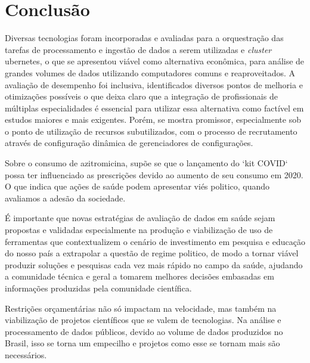 
\chapter{Conclusão}
\label{chap:conclusao}

Diversas tecnologias foram incorporadas e avaliadas para a orquestração das tarefas de processamento e ingestão de dados a serem utilizadas e \emph{cluster} ubernetes, o que se apresentou viável como alternativa econômica, para análise de grandes volumes de dados utilizando computadores comuns e reaproveitados. A avaliação de desempenho foi inclusiva, identificados diversos pontos de melhoria e otimizações possíveis o que deixa claro que a integração de profissionais de múltiplas especialidades é essencial para utilizar essa alternativa como factível em estudos maiores e mais exigentes. Porém, se mostra promissor, especialmente sob o ponto de utilização de recursos subutilizados, com o processo de recrutamento através de configuração dinâmica de gerenciadores de configurações. 

Sobre o consumo de azitromicina, supõe se que o lançamento do ‘kit COVID‘ possa ter influenciado as prescrições devido ao aumento de seu consumo em 2020. O que indica que ações de saúde podem apresentar viés politico, quando avaliamos a adesão da sociedade. 

É importante que novas estratégias de avaliação de dados em saúde sejam propostas e validadas especialmente na produção e viabilização de uso de ferramentas que contextualizem o cenário de investimento em pesquisa e educação do nosso país a extrapolar a questão de regime politico, de modo a tornar viável produzir soluções e pesquisas cada vez mais rápido no campo da saúde, ajudando a comunidade técnica e geral a tomarem melhores decisões embasadas em informações produzidas pela comunidade científica. 

Restrições orçamentárias não só impactam na velocidade, mas também na viabilização de projetos científicos que se valem de tecnologias. Na análise e processamento de dados públicos, devido ao volume de dados produzidos no Brasil, isso se torna um empecilho e projetos como esse se tornam mais são necessários.

